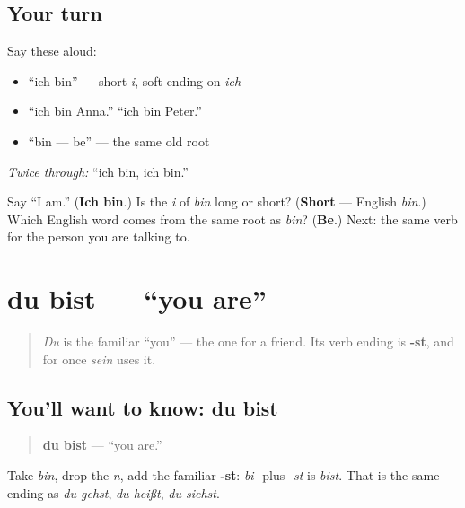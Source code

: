 \subsection*{Your turn}
Say these aloud:

\begin{itemize}
\raggedright
  \item \textquotedblleft{}ich bin\textquotedblright{} — short \emph{i}, soft ending on \emph{ich}
  \item \textquotedblleft{}ich bin Anna.\textquotedblright{} \textquotedblleft{}ich bin Peter.\textquotedblright{}
  \item \textquotedblleft{}bin — be\textquotedblright{} — the same old root
\end{itemize}

\emph{Twice through:} \textquotedblleft{}ich bin, ich bin.\textquotedblright{}

\begin{tcolorbox}[breakable,colback=teal!4,colframe=teal!35!black,title={Before you move on}]
Say \textquotedblleft{}I am.\textquotedblright{} (\textbf{Ich bin}.) Is the \emph{i} of \emph{bin} long or short? (\textbf{Short} — English \emph{bin}.) Which English word comes from the same root as \emph{bin}? (\textbf{Be}.) Next: the same verb for the person you are talking to.
\end{tcolorbox}
\section[du bist]{du bist — \textquotedblleft{}you are\textquotedblright{}}

\label{lesson:GE-C16-du-bist}



\begin{quote}
\emph{Du} is the familiar \textquotedblleft{}you\textquotedblright{} — the one for a friend. Its verb ending is \textbf{-st}, and for once \emph{sein} uses it.
\end{quote}

\subsection*{You'll want to know: du bist}
\begin{quote}
\textbf{du bist} — \textquotedblleft{}you are.\textquotedblright{}
\end{quote}

Take \emph{bin}, drop the \emph{n}, add the familiar \textbf{-st}: \emph{bi-} plus \emph{-st} is \emph{bist}. That is the same ending as \emph{du gehst}, \emph{du heißt}, \emph{du siehst}.

